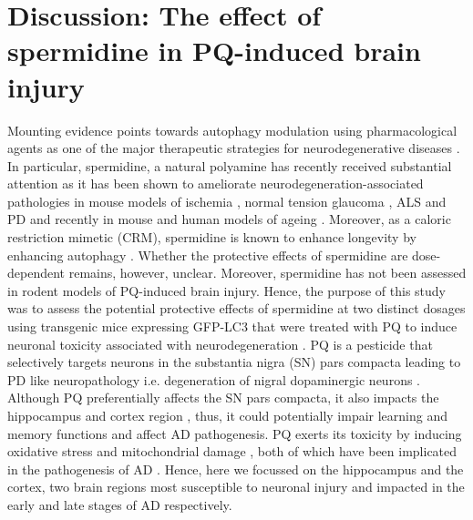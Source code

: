 \section{Discussion: The effect of spermidine in PQ-induced brain injury}
Mounting evidence points towards autophagy modulation using pharmacological agents as one of the major therapeutic strategies for neurodegenerative diseases \citep{Hebron2013,Jiang2014a,Perera2018,Ravikumar2004,Rose2010}. In particular, spermidine, a natural polyamine has recently received substantial attention as it has been shown to ameliorate neurodegeneration-associated pathologies in mouse models of ischemia \citep{Morrison2002}, normal tension glaucoma \citep{Noro2015}, ALS \citep{Wang2012} and  PD \citep{Buttner2014} and recently in mouse and human models of ageing \citep{Schwarz2018,Wirth2019,Wirth2018}. Moreover, as a caloric restriction mimetic (CRM), spermidine is known to enhance longevity by enhancing autophagy \citep{Marino2014}. Whether the protective effects of spermidine are dose-dependent remains, however, unclear. Moreover, spermidine has not been assessed in rodent models of PQ-induced brain injury. Hence, the purpose of this study was to assess the potential protective effects of spermidine at two distinct dosages using transgenic mice expressing GFP-LC3 \citep{Mizushima2004a} that were treated with PQ to induce neuronal toxicity associated with neurodegeneration \citep{Chen2012}. PQ is a pesticide that selectively targets neurons in the substantia nigra (SN) pars compacta leading to PD like neuropathology i.e. degeneration of nigral dopaminergic neurons \citep{McCormack2005, McCormack2002}. Although PQ preferentially affects the SN pars compacta, it also impacts the hippocampus and cortex region \citep{Landrigan2005}, thus, it could potentially impair learning and memory functions and affect AD pathogenesis. PQ exerts its toxicity by inducing oxidative stress and mitochondrial damage \citep{Baltazar2014,Drechsel2008,Lin2006}, both of which have been implicated in the pathogenesis of AD \citep{Lin2006}. Hence, here we focussed on the hippocampus and the cortex, two brain regions most susceptible to neuronal injury and impacted in the early and late stages of AD respectively.

